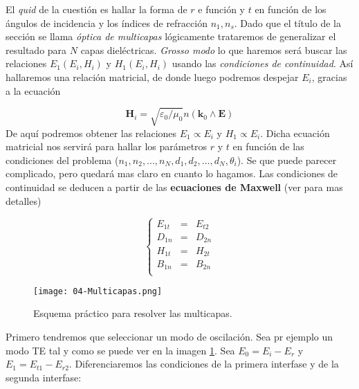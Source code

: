 \documentclass[12pt,a4paper]{book}
\numberwithin{equation}{section}
\numberwithin{figure}{section}
\newcommand{\1}{_{(1)}}
\newcommand{\2}{_{(2)}}
\newcommand{\kn}{\mathbf{k}}
\newcommand{\En}{\mathbf{E}}
\newcommand{\Hn}{\mathbf{H}}
\theoremstyle{definition}
\begin{document}
El \textit{quid} de la cuestión es hallar la forma de $r$ e función y $t$ en función de los ángulos de incidencia y los índices de refracción $n_1,n_s$. Dado que el título de la sección se llama \textit{óptica de multicapas} lógicamente trataremos de generalizar el resultado para $N$ capas dieléctricas. \textit{Grosso modo} lo que haremos será buscar las relaciones $E_1(E_i,H_i)$  y $H_1(E_i,H_i)$ usando las \textit{condiciones de continuidad}. Así hallaremos una relación matricial, de donde luego podremos despejar $E_i$, gracias a la ecuación

\begin{equation}
\Hn_i = \sqrt{\varepsilon_0/\mu_0} n (\kn_0 \wedge \En) \label{Ec:04.5-26}
\end{equation}
De aquí podremos obtener las relaciones $E_1\propto E_i$ y $H_1 \propto E_i$. Dicha ecuación matricial nos servirá para hallar los parámetros $r$ y $t$ en función de las condiciones del problema ($n_1,n_2,...,n_N,d_1,d_2,...,d_N,\theta_i$). Se que puede parecer complicado, pero quedará mas claro en cuanto lo hagamos. Las condiciones de continuidad se deducen a partir de las \textbf{ecuaciones de Maxwell} (ver \cite{libro-1} para mas detalles)

\begin{equation}
\left\lbrace
\begin{array}{lll}
E_{1t} & = & E_{t2}  \\ 
D_{1n} & = & D_{2n} \\
H_{1t} & = & H_{2t} \\
B_{1n} & = & B_{2n} \\
\end{array}
\right.
\end{equation}

\begin{figure}[h!] \centering
\texttt{[image: 04-Multicapas.png]}
\caption{Esquema práctico para resolver las multicapas.}
\label{Fig:04.5-06}
\end{figure}

Primero tendremos que seleccionar un modo de oscilación. Sea pr ejemplo un modo TE tal y como se puede ver en la imagen \ref{Fig:04.5-06}. Sea $E_0=E_i-E_r$ y $E_1=E_{t1}-E_{r2}$. Diferenciaremos las condiciones de la primera interfase y de la segunda interfase:
\end{document}
